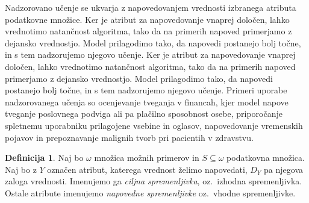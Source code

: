 \documentclass[12pt,a4paper,twoside]{article}
\theoremstyle{definition} %
\newtheorem{definicija}{Definicija}[section]
\theoremstyle{plain} %
\numberwithin{equation}{section}  %
\begin{document}
Nadzorovano učenje se ukvarja z napovedovanjem vrednosti izbranega atributa podatkovne množice.
Ker je atribut za napovedovanje vnaprej določen, lahko vrednotimo natančnost algoritma, tako da na primerih napoved primerjamo z dejansko vrednostjo. 
Model prilagodimo tako, da napovedi postanejo bolj točne, in s tem nadzorujemo njegovo učenje.
Ker je atribut za napovedovanje vnaprej določen, lahko vrednotimo natančnost algoritma, tako da na primerih napoved primerjamo z dejansko vrednostjo. 
Model prilagodimo tako, da napovedi postanejo bolj točne, in s tem nadzorujemo njegovo učenje. 
Primeri uporabe nadzorovanega učenja so ocenjevanje tveganja v financah, kjer model napove tveganje poslovnega podviga ali pa plačilno sposobnost osebe, 
priporočanje spletnemu uporabniku prilagojene vsebine in oglasov, napovedovanje vremenskih pojavov in prepoznavanje malignih tvorb pri pacientih v zdravstvu.

\begin{definicija}


Naj bo $\omega$ množica možnih primerov in $S \subseteq \omega$ podatkovna množica.
Naj bo z $Y$ označen atribut, katerega vrednost želimo napovedati, $D_Y$ pa njegova zaloga vrednosti.
Imenujemo ga \emph{ciljna spremenljivka}, oz.~izhodna spremenljivka.
Ostale atribute imenujemo \emph{napovedne spremenljivke} oz.~vhodne spremenljivke.
\end{definicija}
\end{document}
